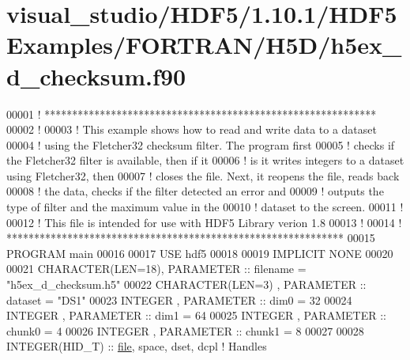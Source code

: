 \hypertarget{visual__studio_2_h_d_f5_21_810_81_2_h_d_f5_examples_2_f_o_r_t_r_a_n_2_h5_d_2h5ex__d__checksum_8f90_source}{}\section{visual\+\_\+studio/\+H\+D\+F5/1.10.1/\+H\+D\+F5\+Examples/\+F\+O\+R\+T\+R\+A\+N/\+H5\+D/h5ex\+\_\+d\+\_\+checksum.f90}
\label{visual__studio_2_h_d_f5_21_810_81_2_h_d_f5_examples_2_f_o_r_t_r_a_n_2_h5_d_2h5ex__d__checksum_8f90_source}

\begin{DoxyCode}
00001 \textcolor{comment}{! ************************************************************}
00002 \textcolor{comment}{!}
00003 \textcolor{comment}{!  This example shows how to read and write data to a dataset}
00004 \textcolor{comment}{!  using the Fletcher32 checksum filter.  The program first}
00005 \textcolor{comment}{!  checks if the Fletcher32 filter is available, then if it}
00006 \textcolor{comment}{!  is it writes integers to a dataset using Fletcher32, then}
00007 \textcolor{comment}{!  closes the file.  Next, it reopens the file, reads back}
00008 \textcolor{comment}{!  the data, checks if the filter detected an error and}
00009 \textcolor{comment}{!  outputs the type of filter and the maximum value in the}
00010 \textcolor{comment}{!  dataset to the screen.}
00011 \textcolor{comment}{!}
00012 \textcolor{comment}{!  This file is intended for use with HDF5 Library verion 1.8}
00013 \textcolor{comment}{!}
00014 \textcolor{comment}{! *************************************************************}
00015 \textcolor{keyword}{PROGRAM} main
00016 
00017   \textcolor{keywordtype}{USE }hdf5
00018 
00019   \textcolor{keywordtype}{IMPLICIT NONE}
00020 
00021   \textcolor{keywordtype}{CHARACTER(LEN=18)}, \textcolor{keywordtype}{PARAMETER} :: filename = \textcolor{stringliteral}{"h5ex\_d\_checksum.h5"}
00022   \textcolor{keywordtype}{CHARACTER(LEN=3)} , \textcolor{keywordtype}{PARAMETER} :: dataset  = \textcolor{stringliteral}{"DS1"}
00023   \textcolor{keywordtype}{INTEGER}          , \textcolor{keywordtype}{PARAMETER} :: dim0     = 32
00024   \textcolor{keywordtype}{INTEGER}          , \textcolor{keywordtype}{PARAMETER} :: dim1     = 64
00025   \textcolor{keywordtype}{INTEGER}          , \textcolor{keywordtype}{PARAMETER} :: chunk0   = 4
00026   \textcolor{keywordtype}{INTEGER}          , \textcolor{keywordtype}{PARAMETER} :: chunk1   = 8
00027   
00028   \textcolor{keywordtype}{INTEGER(HID\_T)}  :: \hyperlink{structfile}{file}, space, dset, dcpl \textcolor{comment}{! Handles}

\end{DoxyCode}
